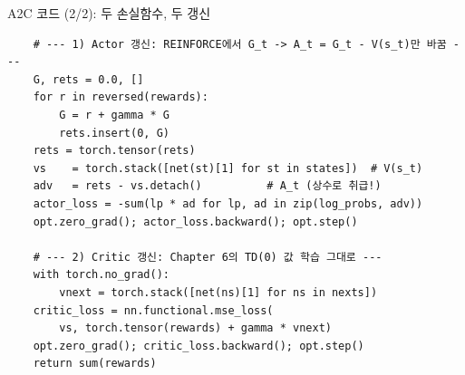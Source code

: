 \documentclass[aspectratio=169,11pt]{beamer}
\begin{document}
\begin{frame}[fragile]{A2C 코드 (2/2): 두 손실함수, 두 갱신}
\begin{lstlisting}
    # --- 1) Actor 갱신: REINFORCE에서 G_t -> A_t = G_t - V(s_t)만 바꿈 ---
    G, rets = 0.0, []
    for r in reversed(rewards):
        G = r + gamma * G
        rets.insert(0, G)
    rets = torch.tensor(rets)
    vs    = torch.stack([net(st)[1] for st in states])  # V(s_t)
    adv   = rets - vs.detach()          # A_t (상수로 취급!)
    actor_loss = -sum(lp * ad for lp, ad in zip(log_probs, adv))
    opt.zero_grad(); actor_loss.backward(); opt.step()

    # --- 2) Critic 갱신: Chapter 6의 TD(0) 값 학습 그대로 ---
    with torch.no_grad():
        vnext = torch.stack([net(ns)[1] for ns in nexts])
    critic_loss = nn.functional.mse_loss(
        vs, torch.tensor(rewards) + gamma * vnext)
    opt.zero_grad(); critic_loss.backward(); opt.step()
    return sum(rewards)
\end{lstlisting}
\end{frame}

\end{document}
